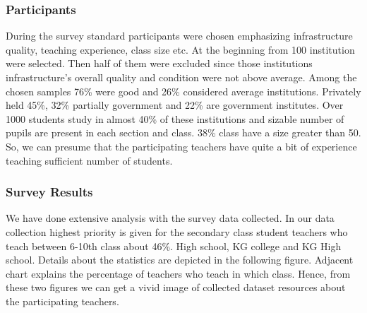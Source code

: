 \documentclass[sn-mathphys,Numbered]{sn-jnl}%
\theoremstyle{thmstyleone}%
\theoremstyle{thmstyletwo}%
\theoremstyle{thmstylethree}%
\begin{document}
\subsubsection{Participants}
During the survey standard participants were chosen emphasizing infrastructure quality, teaching experience, class size etc. At the beginning from 100 institution were selected. Then half of them were excluded since those institutions infrastructure's overall quality and condition were not above average. Among the chosen samples 76\% were good and 26\% considered average institutions. Privately held 45\%, 32\% partially government and 22\% are government institutes.  Over 1000 students study in almost 40\% of these institutions and  sizable number of pupils are present in each section and class. 38\% class have a size greater than 50. So, we can presume that the participating teachers have quite a bit of experience teaching sufficient number of students.  
\subsubsection{Survey Results}
We have done extensive analysis with the survey data collected. In our data collection highest priority is given for the secondary class student teachers who teach between 6-10th class about 46\%. High school, KG college and KG High school. Details about the statistics are depicted in the following figure. Adjacent chart explains the percentage of teachers who teach in which class. Hence, from these two figures we can get a vivid image of collected dataset resources about the participating teachers. 
\end{document}
